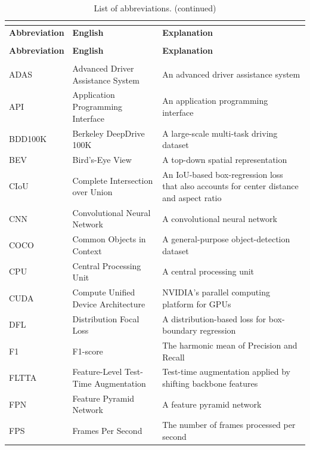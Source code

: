 \documentclass[12pt,a4paper]{report}
\begin{document}
\begin{longtable}{
    >{\RaggedRight\arraybackslash}p{2.7cm}
    >{\RaggedRight\arraybackslash}p{4.2cm}
    >{\RaggedRight\arraybackslash}p{7.0cm}
}
    \caption*{List of abbreviations.}
    \label{tab:abbreviations} \\
    \toprule
    \textbf{Abbreviation} & \textbf{English} & \textbf{Explanation} \\
    \midrule
    \endfirsthead
    \caption*{List of abbreviations. (continued)} \\
    \toprule
    \textbf{Abbreviation} & \textbf{English} & \textbf{Explanation} \\
    \midrule
    \endhead
    \midrule
    \multicolumn{3}{r}{\footnotesize\itshape Continued on next page\ldots} \\
    \endfoot
    \bottomrule
    \endlastfoot
    ADAS & Advanced Driver Assistance System & An advanced driver assistance system \\
    API & Application Programming Interface & An application programming interface \\
    BDD100K & Berkeley DeepDrive 100K & A large-scale multi-task driving dataset \\
    BEV & Bird's-Eye View & A top-down spatial representation \\
    CIoU & Complete Intersection over Union & An IoU-based box-regression loss that also accounts for center distance and aspect ratio \\
    CNN & Convolutional Neural Network & A convolutional neural network \\
    COCO & Common Objects in Context & A general-purpose object-detection dataset \\
    CPU & Central Processing Unit & A central processing unit \\
    CUDA & Compute Unified Device Architecture & NVIDIA's parallel computing platform for GPUs \\
    DFL & Distribution Focal Loss & A distribution-based loss for box-boundary regression \\
    F1 & F1-score & The harmonic mean of Precision and Recall \\
    FLTTA & Feature-Level Test-Time Augmentation & Test-time augmentation applied by shifting backbone features \\
    FPN & Feature Pyramid Network & A feature pyramid network \\
    FPS & Frames Per Second & The number of frames processed per second \\

\end{longtable}
\end{document}
